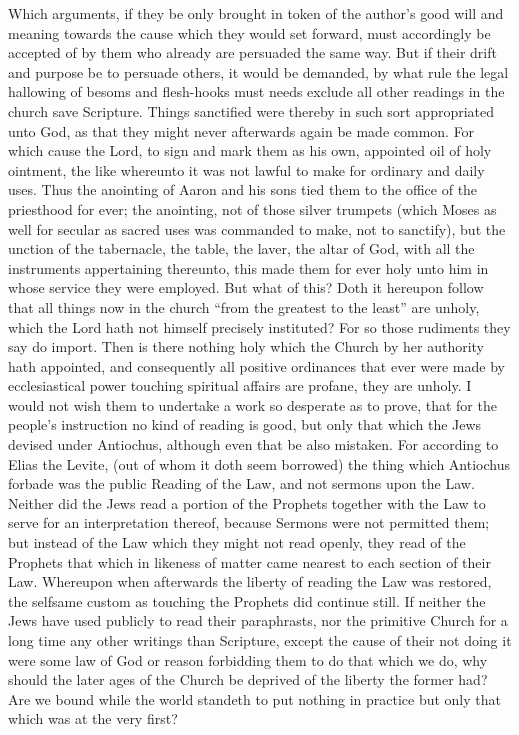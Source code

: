 Which arguments, if they be only brought in token of the author’s good will and meaning towards the cause which they would set forward, must accordingly be accepted of by them who already are persuaded the same way. But if their drift and purpose be to persuade others, it would be demanded,  by what rule the legal hallowing of besoms and flesh-hooks must needs exclude all other readings in the church save Scripture. Things sanctified were thereby in such sort appropriated unto God, as that they might never afterwards again be made common. For which cause the Lord, to sign and mark them as his own, appointed oil of holy ointment, the like whereunto it was not lawful to make for ordinary and daily uses. Thus the anointing of Aaron and his sons tied them to the office of the priesthood for ever; the anointing, not of those silver trumpets (which Moses as well for secular as sacred uses was commanded to make, not to sanctify), but the unction of the tabernacle, the table, the laver, the altar of God, with all the instruments appertaining thereunto, this made them for ever holy unto him in whose service they were employed. But what of this? Doth it hereupon follow that all things now in the church “from the greatest to the least” are unholy, which the Lord hath not himself precisely instituted? For so those rudiments they say do import. Then is there nothing holy which the Church by her authority hath appointed, and consequently all positive ordinances that ever were made by ecclesiastical power touching spiritual affairs are profane, they are unholy.
I would not wish them to undertake a work so desperate as to prove, that for the people’s instruction no kind of reading is good, but only that which the Jews devised under Antiochus, although even that be also mistaken. For according to Elias the Levite, (out of whom it doth seem borrowed)  the thing which Antiochus forbade was the public Reading of the Law, and not sermons upon the Law. Neither did the Jews read a portion of the Prophets together with the Law to serve for an interpretation thereof, because Sermons were not permitted them; but instead of the Law which they might not read openly, they read of the Prophets that which in likeness of matter came nearest to each section of their Law. Whereupon when afterwards the liberty of reading the Law was restored, the selfsame custom as touching the Prophets did continue still.
If neither the Jews have used publicly to read their paraphrasts, nor the primitive Church for a long time any other writings than Scripture, except the cause of their not doing it were some law of God or reason forbidding them to do that which we do, why should the later ages of the Church be deprived of the liberty the former had? Are we bound while the world standeth to put nothing in practice but only that which was at the very first?
